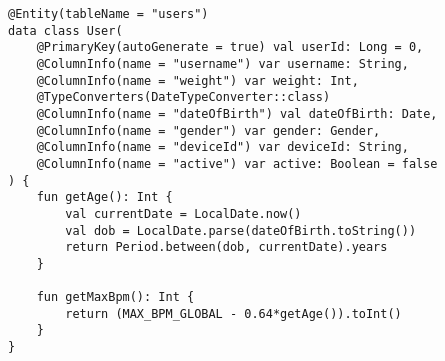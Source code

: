 \begin{lstlisting}[caption={User Entity (Kotlin)}]
@Entity(tableName = "users")
data class User(
    @PrimaryKey(autoGenerate = true) val userId: Long = 0,
    @ColumnInfo(name = "username") var username: String,
    @ColumnInfo(name = "weight") var weight: Int,
    @TypeConverters(DateTypeConverter::class)
    @ColumnInfo(name = "dateOfBirth") val dateOfBirth: Date,
    @ColumnInfo(name = "gender") var gender: Gender,
    @ColumnInfo(name = "deviceId") var deviceId: String,
    @ColumnInfo(name = "active") var active: Boolean = false
) {
    fun getAge(): Int {
        val currentDate = LocalDate.now()
        val dob = LocalDate.parse(dateOfBirth.toString())
        return Period.between(dob, currentDate).years
    }

    fun getMaxBpm(): Int {
        return (MAX_BPM_GLOBAL - 0.64*getAge()).toInt()
    }
}
\end{lstlisting}
